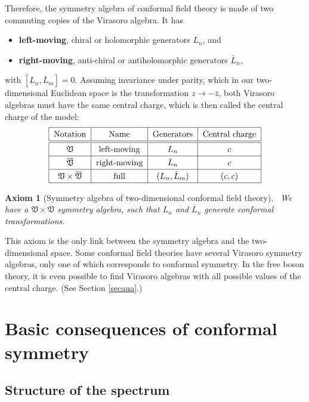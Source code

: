 \documentclass[12pt, a4paper, notitlepage, twoside]{report}
\numberwithin{equation}{section}
\theoremstyle{break}
\newtheorem{hyp}{Axiom}[chapter]
\begin{document}
Therefore, the symmetry algebra of conformal field theory is made of two commuting copies of the Virasoro algebra. It has
\begin{itemize}
 \item \textbf{\boldmath left-moving}, chiral or holomorphic
generators $L_n$,  and
\item  \textbf{\boldmath right-moving}, anti-chiral or antiholomorphic generators $\bar{L}_n$,
\end{itemize}
 with
$[L_n,\bar{L}_m]=0$. Assuming invariance under parity, which in our two-dimensional Euclidean space is the transformation $z\to -\bar z$, 
both Virasoro algebras must have the same central charge, which is then called the central charge of the model:
\begin{align}
\renewcommand{\arraystretch}{1.3}
 \begin{tabular}{|c|c|c|c|}
 \hline
Notation &  Name & Generators &  Central\ charge
\\
\hline\hline
 $\mathfrak{V}$ & left-moving & $L_n$ & $c$
\\
\hline
$\overline{\mathfrak{V}}$ & right-moving & $\bar{L}_n$ & $c$
\\
\hline
$\mathfrak{V}\times \overline{\mathfrak{V}}$ & full & $(L_n,\bar{L}_m)$ & $(c,c)$
\\  
\hline
 \end{tabular}
\end{align}

\begin{hyp}[Symmetry algebra of two-dimensional conformal field theory]
 ~\label{ax:sa}
 We have a $\mathfrak{V}\times \overline{\mathfrak{V}}$ symmetry algebra, such that $L_n$ and $\bar{L}_n$ generate conformal transformations. 
\end{hyp} 
\noindent
This axiom is the only link between the symmetry algebra and the two-dimensional space.
Some conformal field theories have several Virasoro symmetry algebras, only one of which corresponds to conformal symmetry.
In the free boson theory, it is even possible to find Virasoro algebras with all possible values of the central charge. (See Section \ref{secaua}.)


\section{Basic consequences of conformal symmetry}

\subsection{Structure of the spectrum \label{secsots}}
\end{document}
